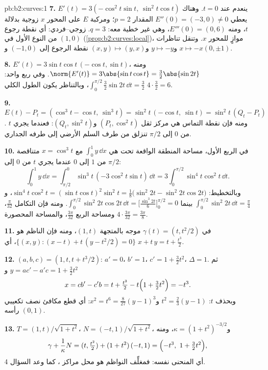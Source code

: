 \begin{solution}{pb:b2:curves:1}
\textbf{7.} $E'(t) = 3(-\cos^2 t\sin t,\ \sin^2 t\cos t)$ ينعدم عند $t = 0$. وهناك يعطي $E''(0) = (-3, 0) \neq 0$ المقدار
$p = 2$؛ ومركبة $E$ على المحور $x$ زوجية بدلالة $t$، ومنه
$E'''(0) = (0, 6)$، وهي غير خطية معه: $q = 3$. زوجي--فردي: أي نقطة رجوع من النوع
الأول في $(1, 0)$ (\cref{prop:b2:curves:local})،  موازٍ للمحور $x$. وتنقل تناظرات
 $x \mapsto -x$ و$y \mapsto -y$ و$(x,
y) \mapsto (y, x)$ نقطة الرجوع إلى $(-1,
0)$ و$(0, \pm1)$.

\textbf{8.} $E'(t) = 3\sin t\cos t\,(-\cos t, \sin t)$، ومنه $\norm{E'(t)} = 3\abs{\sin t\cos t} = \tfrac32\abs{\sin 2t}$.
وفي ربع واحد: $\int_0^{\pi/2}\tfrac32\sin 2t\,\dd t =
\tfrac32$، وبالتناظر يكون الطول الكلي $4 \cdot
\tfrac32 = 6$.

\textbf{9.} $E(t) - P_t = (\cos^3 t - \cos t,\ \sin^3 t) =
\sin^2 t\,(-\cos t,\ \sin t) = \sin^2 t\,(Q_t - P_t)$. ومنه فإن نقطة التماس هي مركز ثقل $(P_t, \cos^2 t)$ و$(Q_t, \sin^2 t)$:
فعندما يجري $t$ من $0$ إلى $\pi/2$ تنزلق من طرف السلم الأرضي
إلى طرفه الجداري.

\textbf{10.} في الربع الأول، مساحة المنطقة الواقعة تحت  هي
$\int_0^1 y\,\dd x$ مع $x = \cos^3 t$ متناقصة من $1$ إلى $0$ عندما يجري $t$
من $0$ إلى $\pi/2$:
\[
\int_0^1 y\,\dd x
= \int_{\pi/2}^{0}\sin^3 t\,(-3\cos^2 t\sin t)\,\dd t
= 3\int_0^{\pi/2}\sin^4 t\cos^2 t\,\dd t .
\]
وبالتخطيط: $\sin^4 t\cos^2 t = (\sin t\cos t)^2\sin^2 t =
\tfrac18\bigl(\sin^2 2t - \sin^2 2t\cos 2t\bigr)$، و$\int_0^{\pi/2}\sin^2 2t\,\dd t = \tfrac\pi4$ بينما $\int_0^{\pi/2}\sin^2 2t\cos 2t\,\dd t =
\bigl[\tfrac{\sin^3 2t}6\bigr]_0^{\pi/2} = 0$. ومنه فإن التكامل $\tfrac\pi{32}$،
ومساحة الربع $\tfrac{3\pi}{32}$، والمساحة المحصورة $4 \cdot
\tfrac{3\pi}{32} = \tfrac{3\pi}8$.

\textbf{11.}  في $\gamma(t) = (t, t^2/2)$ موجه بالمتجهة $(1, t)$، ومنه فإن الناظم
هو $\{(x, y) : (x -
t) + t\,(y - t^2/2) = 0\}$، أي $x + t\,y = t +
\tfrac{t^3}2$.

\textbf{12.} $(a, b, c) = (1, t, t + t^3/2)$: $a' = 0$، $b' =
1$، $c' = 1 + \tfrac32 t^2$، $\Delta = 1$. ثم $y = ac' -
a'c = 1 + \tfrac32t^2$ و
\[
x = cb' - c'b = t + \tfrac{t^3}2 - t\Bigl(1 +
\tfrac32t^2\Bigr) = -t^3 .
\]
وبحذف $t$: $t^2 = \tfrac23(y - 1)$ و$x^2 = t^6 =
\tfrac8{27}(y - 1)^3$: أي قطع مكافئ نصف تكعيبي رأسه $(0, 1)$.

\textbf{13.} $T = (1, t)/\sqrt{1+t^2}$، $N = (-t,
1)/\sqrt{1+t^2}$، و$\kappa = (1+t^2)^{-3/2}$، ومنه
\[
\gamma + \frac1\kappa N = (t, \tfrac{t^2}2) +
(1+t^2)\,(-t, 1) = \Bigl(-t^3,\ 1 + \tfrac32t^2\Bigr),
\]
أي المنحنى نفسه: فمغلِّف النواظم هو محل مراكز ، كما وعد
السؤال 4.


\end{solution}
